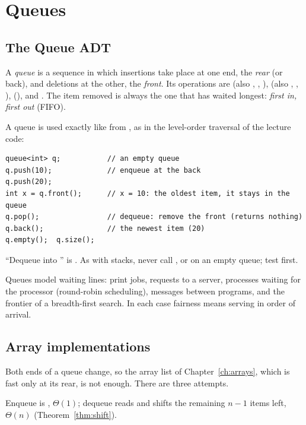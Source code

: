 \chapter{Queues}\label{ch:queues}

\section{The Queue ADT}

\begin{definition}[Queue]
A \emph{queue} is a sequence in which insertions take place at one end, the
\emph{rear} (or back), and deletions at the other, the \emph{front}. Its operations are
 (also , , ),  (also ,
, ),  (),  and . The
item removed is always the one that has waited longest: \emph{first in, first out}
(FIFO).
\end{definition}

 A queue is used exactly like  from
, as in the level-order traversal of the lecture code:
\begin{lstlisting}[style=starter]
queue<int> q;           // an empty queue
q.push(10);             // enqueue at the back
q.push(20);
int x = q.front();      // x = 10: the oldest item, it stays in the queue
q.pop();                // dequeue: remove the front (returns nothing)
q.back();               // the newest item (20)
q.empty();  q.size();
\end{lstlisting}
``Dequeue into '' is . As with stacks, never call
,  or  on an empty queue; test  first.

Queues model waiting lines: print jobs, requests to a server, processes waiting for the
processor (round-robin scheduling), messages between programs, and the frontier of a
breadth-first search. In each case fairness means serving in order of arrival.

\section{Array implementations}

Both ends of a queue change, so the array list of Chapter~\ref{ch:arrays}, which is fast
only at its rear, is not enough. There are three attempts.

 Enqueue is , $\Theta(1)$; dequeue reads
 and shifts the remaining $n-1$ items left, $\Theta(n)$
(Theorem~\ref{thm:shift}).

